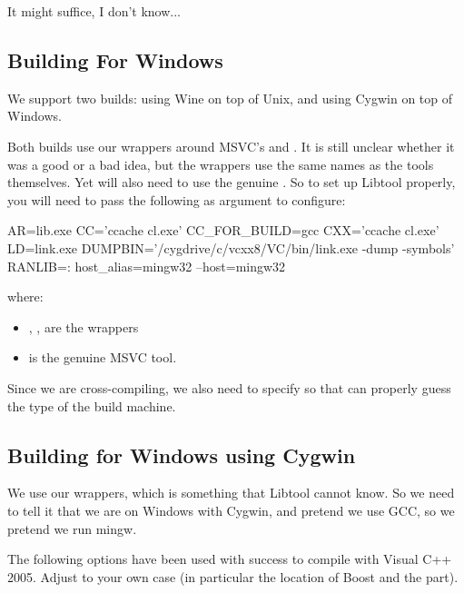 It might suffice, I don't know...

\subsection{Building For Windows}

We support two builds: using Wine on top of Unix, and using Cygwin on
top of Windows.

Both builds use our wrappers around MSVC's  and
.  It is still unclear whether it was a good or a bad
idea, but the wrappers use the same names as the tools themselves.  Yet
 will also need to use the genuine .  So
to set up Libtool properly, you will need to pass the following as argument
to configure:

\begin{shell}
AR=lib.exe
CC='ccache cl.exe'
CC_FOR_BUILD=gcc
CXX='ccache cl.exe'
LD=link.exe
DUMPBIN='/cygdrive/c/vcxx8/VC/bin/link.exe -dump -symbols'
RANLIB=:
host_alias=mingw32
--host=mingw32
\end{shell}

where:
\begin{itemize}
\item {}, ,  are the wrappers
\item {} is the genuine MSVC tool.
\end{itemize}

Since we are cross-compiling, we also need to specify 
so that  can properly guess the type of the build
machine.

\subsection{Building for Windows using Cygwin}

We use our  wrappers, which is something that Libtool cannot
know.  So we need to tell it that we are on Windows with Cygwin, and pretend
we use GCC, so we pretend we run mingw.

The following options have been used with success to compile \usdk with
Visual C++ 2005.  Adjust to your own case (in particular the location of
Boost and the  part).

